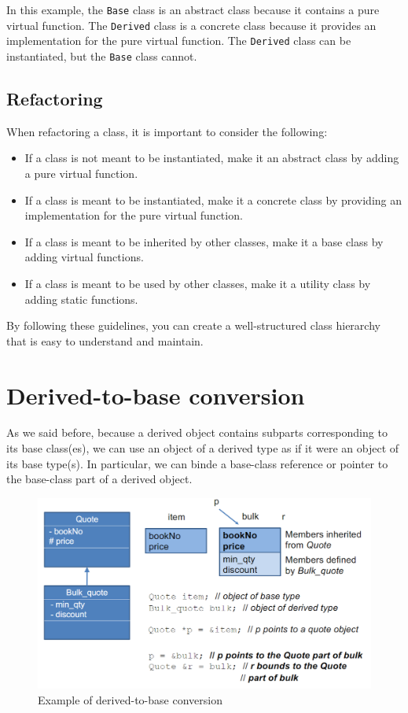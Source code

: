 In this example, the \texttt{Base} class is an abstract class because it contains a pure virtual
function. The \texttt{Derived} class is a concrete class because it provides an implementation
for the pure virtual function. The \texttt{Derived} class can be instantiated, but the \texttt{Base}
class cannot.

\subsection{Refactoring}

When refactoring a class, it is important to consider the following:

\begin{itemize}
    \item If a class is not meant to be instantiated, make it an abstract class by adding
    a pure virtual function.
    \item If a class is meant to be instantiated, make it a concrete class by providing
    an implementation for the pure virtual function.
    \item If a class is meant to be inherited by other classes, make it a base class by
    adding virtual functions.
    \item If a class is meant to be used by other classes, make it a utility class by
    adding static functions.
\end{itemize}

By following these guidelines, you can create a well-structured class hierarchy that is
easy to understand and maintain.

\section{Derived-to-base conversion}

As we said before, because a derived object contains subparts corresponding to its base class(es),
we can use an object of a derived type as if it were an object of its base type(s). In particular,
we can binde a base-class reference or pointer to the base-class part of a derived object.

\begin{figure}[H]
    \centering
    \includegraphics[width=12cm]{figures/derived-to-base_conv.png}
    \caption{Example of derived-to-base conversion}
    \label{fig:derived-to-base}
\end{figure}

